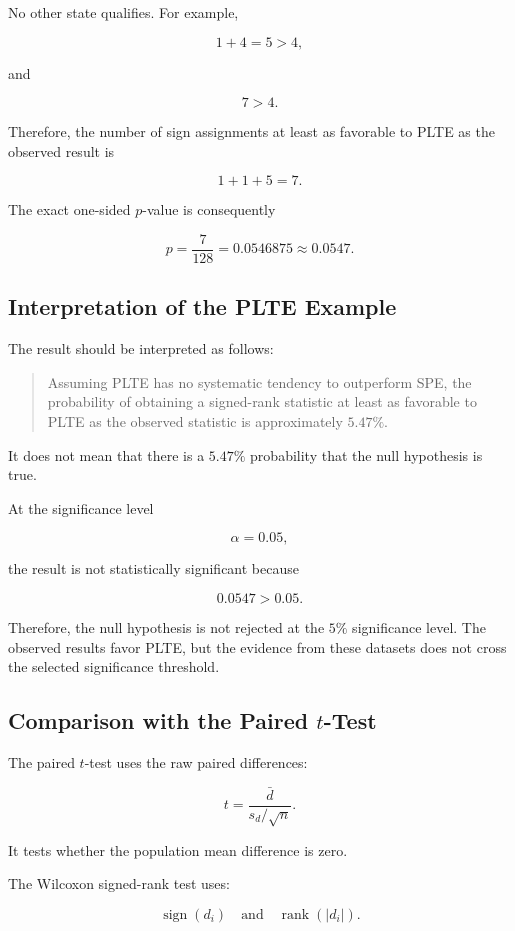 \documentclass[11pt]{article}
\begin{document}
No other state qualifies. For example,

\[
1+4=5>4,
\]

and

\[
7>4.
\]

Therefore, the number of sign assignments at least as favorable to PLTE
as the observed result is

\[
1+1+5=7.
\]

The exact one-sided \(p\)-value is consequently

\[
\boxed{
p
=
\frac{7}{128}
=
0.0546875
\approx0.0547.
}
\]

\subsection{Interpretation of the PLTE Example}

The result should be interpreted as follows:

\begin{quote}
Assuming PLTE has no systematic tendency to outperform SPE, the
probability of obtaining a signed-rank statistic at least as favorable
to PLTE as the observed statistic is approximately \(5.47\%\).
\end{quote}

It does not mean that there is a \(5.47\%\) probability that the null
hypothesis is true.

At the significance level

\[
\alpha=0.05,
\]

the result is not statistically significant because

\[
0.0547>0.05.
\]

Therefore, the null hypothesis is not rejected at the \(5\%\)
significance level. The observed results favor PLTE, but the evidence
from these datasets does not cross the selected significance threshold.

\subsection{Comparison with the Paired \(t\)-Test}

The paired \(t\)-test uses the raw paired differences:

\[
t
=
\frac{\bar{d}}{s_d/\sqrt{n}}.
\]

It tests whether the population mean difference is zero.

The Wilcoxon signed-rank test uses:

\[
\operatorname{sign}(d_i)
\quad\text{and}\quad
\operatorname{rank}(|d_i|).
\]
\end{document}
